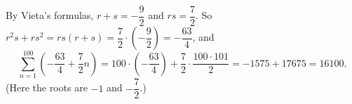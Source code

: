 By Vieta's formulas, $r+s=-\dfrac92$ and $rs=\dfrac72$. So $r^2s+rs^2=rs(r+s)=\dfrac72\cdot\left(-\dfrac92\right)=-\dfrac{63}{4}$, and
\[\sum_{n=1}^{100}\left(-\dfrac{63}{4}+\dfrac72n\right)=100\cdot\left(-\dfrac{63}4\right)+\dfrac72\cdot\dfrac{100\cdot101}{2}=-1575+17675=\boxed{16100}.\]
(Here the roots are $-1$ and $-\dfrac72$.)
